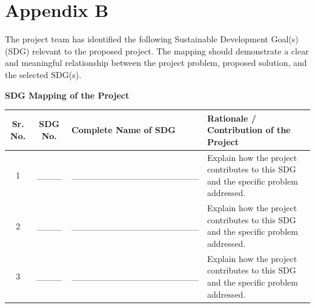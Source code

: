 \chapter*{Appendix B}

\label{app:sdg_mapping}

The project team has identified the following Sustainable Development Goal(s) (SDG) relevant to the proposed project. The mapping should demonstrate a clear and meaningful relationship between the project problem, proposed solution, and the selected SDG(s).

\vspace{0.4cm}

\begin{center}
\textbf{\large SDG Mapping of the Project}
\end{center}

\vspace{0.3cm}


\renewcommand{\arraystretch}{1.4}

\begin{center}
\begin{tabular}{|c|c|p{4.2cm}|p{6.0cm}|}
\hline
\textbf{Sr. No.} &
\textbf{SDG No.} &
\textbf{Complete Name of SDG} &
\textbf{Rationale / Contribution of the Project} \\
\hline

1 &
\_\_\_\_ &
\parbox[t]{4.2cm}{
\vspace{0.15cm}
\_\_\_\_\_\_\_\_\_\_\_\_\_\_\_\_\_\_\_\_
\vspace{1.4cm}
} &
\parbox[t]{6.0cm}{
\vspace{0.15cm}
Explain how the project contributes to this
SDG and the specific problem addressed.
\vspace{1.4cm}
}
\\
\hline

2 &
\_\_\_\_ &
\parbox[t]{4.2cm}{
\vspace{0.15cm}
\_\_\_\_\_\_\_\_\_\_\_\_\_\_\_\_\_\_\_\_
\vspace{1.4cm}
} &
\parbox[t]{6.0cm}{
\vspace{0.15cm}
Explain how the project contributes to this
SDG and the specific problem addressed.
\vspace{1.4cm}
}
\\
\hline

3 &
\_\_\_\_ &
\parbox[t]{4.2cm}{
\vspace{0.15cm}
\_\_\_\_\_\_\_\_\_\_\_\_\_\_\_\_\_\_\_\_
\vspace{1.4cm}
} &
\parbox[t]{6.0cm}{
\vspace{0.15cm}
Explain how the project contributes to this
SDG and the specific problem addressed.
\vspace{1.4cm}
}
\\
\hline

\end{tabular}
\end{center}

